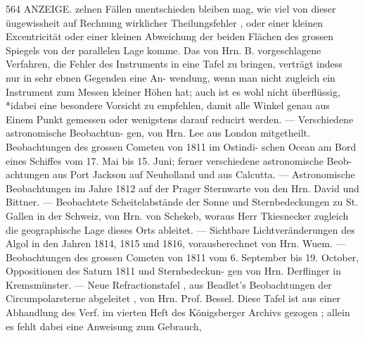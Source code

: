 \documentclass[12pt,a4paper]{article}
\begin{document}
\newpage
564 ANZEIGE.\newline
zelnen Fällen unentschieden bleiben mag, wie viel von dieser üugewissheit auf Rechnung wirklicher\newline
Theilungsfehler , oder einer kleinen Excentricität oder einer kleinen Abweichung der beiden Flächen\newline
des grossen Spiegels von der parallelen Lage komme. Das von Hrn. B. vorgeschlagene Verfahren, die\newline
Fehler des Instruments in eine Tafel zu bringen, verträgt indess nur in sehr ebnen Gegenden eine An-\newline
wendung, wenn man nicht zugleich ein Instrument zum Messen kleiner Höhen hat; auch ist es wohl\newline
nicht überflüssig, *idabei eine besondere Vorsicht zu empfehlen, damit alle Winkel genau aus Einem\newline
Punkt gemessen oder wenigstens darauf reducirt werden. --- Verschiedene astronomische Beobachtun-\newline
gen, von Hrn. Lee aus London mitgetheilt. Beobachtungen des grossen Cometen von 1811 im Ostindi-\newline
schen Ocean am Bord eines Schiffes vom 17. Mai bis 15. Juni; ferner verschiedene astronomische Beob-\newline
achtungen aus Port Jackson auf Neuholland und aus Calcutta. --- Astronomische Beobachtungen im\newline
Jahre 1812 auf der Prager Sternwarte von den Hrn. David und Bittner. --- Beobachtete Scheitelabstände\newline
der Sonne und Sternbedeckungen zu St. Gallen in der Schweiz, von Hrn. von Schekeb, woraus Herr\newline
Tkiesnecker zugleich die geographische Lage dieses Orts ableitet. --- Sichtbare Lichtveränderungen des\newline
Algol in den Jahren 1814, 1815 und 1816, vorausberechnet von Hrn. Wuem. --- Beobachtungen des grossen\newline
Cometen von 1811 vom 6. September bis 19. October, Oppositionen des Saturn 1811 und Sternbedeckun-\newline
gen von Hrn. Derflinger in Kremsmünster. --- Neue Refractionstafel , aus Beadlet's Beobachtungen\newline
der Circumpolarsterne abgeleitet , von Hrn. Prof. Bessel. Diese Tafel ist aus einer Abhandlung des Verf.\newline
im vierten Heft des Königsberger Archivs gezogen ; allein es fehlt dabei eine Anweisung zum Gebrauch,\newline
\end{document}
